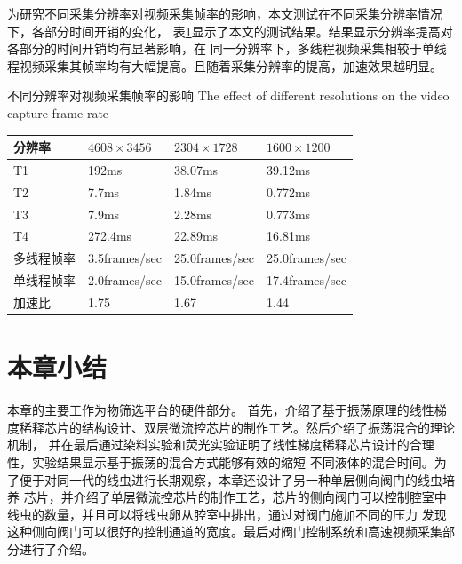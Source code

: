 	为研究不同采集分辨率对视频采集帧率的影响，本文测试在不同采集分辨率情况下，各部分时间开销的变化，
	表\ref{tab:resolutions}显示了本文的测试结果。结果显示分辨率提高对各部分的时间开销均有显著影响，在
	同一分辨率下，多线程视频采集相较于单线程视频采集其帧率均有大幅提高。且随着采集分辨率的提高，加速效果越明显。
	\begin{table}[thbp]
	\centering
	\bicaption
    {不同分辨率对视频采集帧率的影响}
    {The effect of different resolutions on the video capture frame rate}
	\label{tab:resolutions}
	\begin{tabular}{p{80pt}p{80pt}p{80pt}p{80pt}}
	\toprule
	分辨率 & $4608\times3456$ & $2304\times1728$ & $1600\times1200$ \\
	\midrule
	T1     & 192ms & 38.07ms & 39.12ms  \\
	T2     & 7.7ms & 1.84ms & 0.772ms \\
	T3		& 7.9ms & 2.28ms & 0.773ms \\
	T4 		& 272.4ms & 22.89ms & 16.81ms \\
	多线程帧率 & 3.5frames/sec & 25.0frames/sec & 25.0frames/sec \\
	单线程帧率 & 2.0frames/sec  &15.0frames/sec &  17.4frames/sec \\
	加速比		&  1.75		  &   1.67        &  1.44 \\
	\bottomrule
	\end{tabular}
	\end{table}
\section{本章小结}
	本章的主要工作为物筛选平台的硬件部分。
	首先，介绍了基于振荡原理的线性梯度稀释芯片的结构设计、双层微流控芯片的制作工艺。然后介绍了振荡混合的理论机制，
	并在最后通过染料实验和荧光实验证明了线性梯度稀释芯片设计的合理性，实验结果显示基于振荡的混合方式能够有效的缩短
	不同液体的混合时间。为了便于对同一代的线虫进行长期观察，本章还设计了另一种单层侧向阀门的线虫培养
	芯片，并介绍了单层微流控芯片的制作工艺，芯片的侧向阀门可以控制腔室中线虫的数量，并且可以将线虫卵从腔室中排出，通过对阀门施加不同的压力
	发现这种侧向阀门可以很好的控制通道的宽度。最后对阀门控制系统和高速视频采集部分进行了介绍。